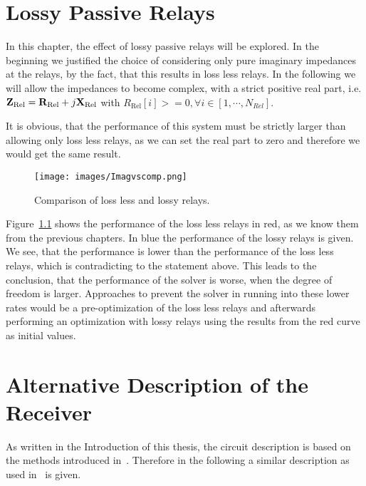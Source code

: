 \chapter{Lossy Passive Relays}
\label{sec:lossyrel}

In this chapter, the effect of lossy passive relays will be explored.
In the beginning we justified the choice of considering only pure imaginary impedances at the relays, by the fact, that this results in loss less relays.
In the following we will allow the impedances to become complex, with a strict positive real part, i.e.
$\mathbf{Z}_\text{Rel} = \mathbf{R}_\text{Rel} + j\mathbf{X}_\text{Rel}$ with $R_\text{Rel}[i]>=0,\forall i\in[1,\cdots,N_{Rel}]$.

It is obvious, that the performance of this system must be strictly larger than allowing only loss less relays, as we can set the real part to zero and therefore we would get the same result.

\begin{figure}[h]
\centering
  \texttt{[image: images/Imagvscomp.png]}
\caption{Comparison of loss less and lossy relays.}
\label{fig:lossyrel}
\end{figure}

Figure~\ref{fig:lossyrel} shows the performance of the loss less relays in red, as we know them from the previous chapters.
In blue the performance of the lossy relays is given.
We see, that the performance is lower than the performance of the loss less relays, which is contradicting to the statement above.
This leads to the conclusion, that the performance of the solver is worse, when the degree of freedom is larger.
Approaches to prevent the solver in running into these lower rates would be a pre-optimization of the loss less relays and afterwards performing an optimization with lossy relays using the results from the red curve as initial values.



\chapter{Alternative Description of the Receiver}
\label{sec:nossek}

As written in the Introduction of this thesis, the circuit description is based on the methods introduced in~\cite{Nossek}.
Therefore in the following a similar description as used in~\cite{Nossek} is given. 

